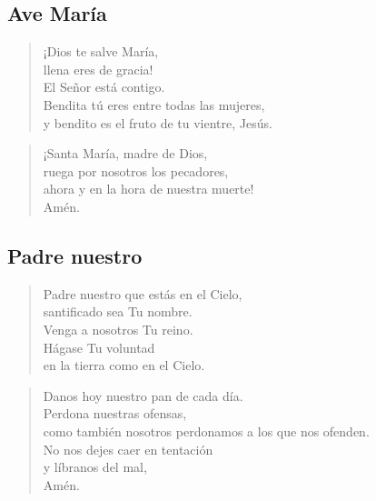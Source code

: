 \documentclass[spanish,utf8,twocolumn]{chlart}
\newenvironment{uno}{%
	\begin{verse}\color{lector}}{\end{verse}}
\newenvironment{todos}{%
	\begin{verse}\color{responden}}{\end{verse}}
\begin{document}
\subsection*{Ave María}

\begin{uno}
¡Dios te salve María,\\llena eres de gracia!\\
El Señor está contigo.\\
Bendita tú eres entre todas las mujeres,\\
y bendito es el fruto de tu vientre, Jesús.
\end{uno}

\begin{todos}
¡Santa María, madre de Dios,\\
ruega por nosotros los pecadores,\\
ahora y en la hora de nuestra muerte!\\
Amén.
\end{todos}

\subsection*{Padre nuestro}

\begin{uno}
Padre nuestro que estás en el Cielo,\\
santificado sea Tu nombre.\\
Venga a nosotros Tu reino.\\
Hágase Tu voluntad\\
en la tierra como en el Cielo.
\end{uno}

\begin{todos}
Danos hoy nuestro pan de cada día.\\
Perdona nuestras ofensas,\\
como también nosotros perdonamos a los que nos ofenden.\\
No nos dejes caer en tentación\\
y líbranos del mal,\\
Amén.
\end{todos}
\end{document}

